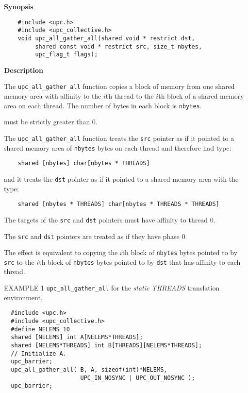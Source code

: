 {\bf Synopsis} 

\npf\vspace{-2.5em} 
\begin{verbatim}
    #include <upc.h>
    #include <upc_collective.h>
    void upc_all_gather_all(shared void * restrict dst,
         shared const void * restrict src, size_t nbytes,
         upc_flag_t flags);
\end{verbatim}

{\bf Description} 

\np
The {\tt upc\_all\_gather\_all} function copies a block of memory from one
shared memory area with affinity to the $i$th thread to the $i$th block
of a shared memory area on each thread.
The number of bytes in each block is {\tt nbytes}.

 must be strictly greater than 0.

\np The {\tt upc\_all\_gather\_all} function treats the {\tt src} pointer
as if it pointed to a shared memory area of {\tt nbytes} bytes on each
thread and therefore had type:

\begin{verbatim}
    shared [nbytes] char[nbytes * THREADS]
\end{verbatim}  

\np and it treats the {\tt dst} pointer as if it pointed to a shared
memory area with the type:

\begin{verbatim}
    shared [nbytes * THREADS] char[nbytes * THREADS * THREADS]
\end{verbatim} 

\np The targets of the {\tt src} and {\tt dst} pointers
must have affinity to thread 0.

\np The {\tt src} and {\tt dst} pointers are treated as
if they have phase 0.

\np
The effect is equivalent to copying the
$i$th block of {\tt nbytes} bytes pointed to by {\tt src} to the
$i$th block of {\tt nbytes} bytes pointed to by {\tt dst} that
has affinity to each thread.

\np EXAMPLE 1 {\tt upc\_all\_gather\_all} for the {\em static THREADS}
translation environment.

\begin{verbatim}
  #include <upc.h>
  #include <upc_collective.h>
  #define NELEMS 10
  shared [NELEMS] int A[NELEMS*THREADS];
  shared [NELEMS*THREADS] int B[THREADS][NELEMS*THREADS];
  // Initialize A.
  upc_barrier;
  upc_all_gather_all( B, A, sizeof(int)*NELEMS,
                      UPC_IN_NOSYNC | UPC_OUT_NOSYNC );
  upc_barrier;
\end{verbatim}


